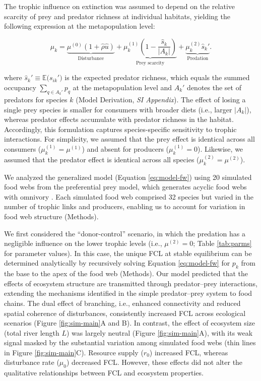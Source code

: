 \documentclass[11pt, class=article, crop=false]{standalone}
\theoremstyle{definition}
\begin{document}
The trophic influence on extinction was assumed to depend on the relative scarcity of prey and predator richness at individual habitats, yielding the following expression at the metapopulation level:

\begin{equation}
    \mu_{k} = 
        \underbrace{\mu^{(0)} (1 + \hat{\rho} \hat{u})}_{\text{Disturbance}} + 
        \underbrace{\mu_k^{(1)} \left(1 - \frac{\hat{s}_k}{|A_{k}|}\right)}_{\text{Prey scarcity}} +
        \underbrace{\mu_k^{(2)} \hat{s}_k'}_{\text{Predation}} .
    \label{eq:extn-main}    
\end{equation}

where $\hat{s}_k' \equiv \mathbb{E}\bigl(s_{ik}'\bigr)$ is the expected predator richness, which equals the summed occupancy $\sum_{q \in A_k'} p_q$ at the metapopulation level and $A_k'$ denotes the set of predators for species $k$ (Model Derivation, \textit{SI Appendix}).
The effect of losing a single prey species is smaller for consumers with broader diets (i.e., larger $|A_k|$), whereas predator effects accumulate with predator richness in the habitat.
Accordingly, this formulation captures species-specific sensitivity to trophic interactions.
For simplicity, we assumed that the prey effect is identical across all consumers ($\mu_k^{(1)} = \mu^{(1)}$) and absent for producers ($\mu_k^{(1)} = 0$).
Likewise, we assumed that the predator effect is identical across all species ($\mu_k^{(2)} = \mu^{(2)}$).

We analyzed the generalized model (Equation \ref{eq:model-fw}) using 20 simulated food webs from the preferential prey model, which generates acyclic food webs with omnivory \citep{shibasaki_food_2024, johnson_trophic_2014}.
Each simulated food web comprised 32 species but varied in the number of trophic links and producers, enabling us to account for variation in food web structure (Methods).

We first considered the ``donor-control'' scenario, in which the predation has a negligible influence on the lower trophic levels (i.e., $\mu^{(2)} = 0$; Table \ref{tab:parms} for parameter values).
In this case, the unique FCL at stable equilibrium can be determined analytically by recursively solving Equation \ref{eq:model-fw} for $p_k$ from the base to the apex of the food web (Methods).
Our model predicted that the effects of ecosystem structure are transmitted through predator–prey interactions, extending the mechanisms identified in the simple predator–prey system to food chains. 
The dual effect of branching, i.e., enhanced connectivity and reduced spatial coherence of disturbances, consistently increased FCL across ecological scenarios (Figure \ref{fig:sim-main}A and B). 
In contrast, the effect of ecosystem size (total river length $L$) was largely neutral (Figure \ref{fig:sim-main}A), with its weak signal masked by the substantial variation among simulated food webs (thin lines in Figure \ref{fig:sim-main}C).
Resource supply ($r_0$) increased FCL, whereas disturbance rate ($\mu_0$) decreased FCL.
However, these effects did not alter the qualitative relationships between FCL and ecosystem properties.
\end{document}
